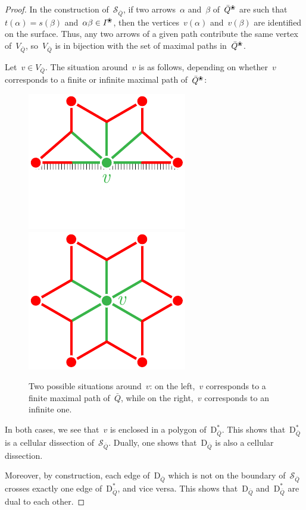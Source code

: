 \documentclass{amsart}
\theoremstyle{definition}
\newcommand{\blossom}{^\text{\ding{96}}} %
\newcommand{\surface}{\mathcal{S}} %
\newcommand{\dual}{^*} %
\newcommand{\dissection}{\mathrm{D}} %
\begin{document}
\begin{proof}
In the construction of~$\surface_{\bar Q}$, if two arrows~$\alpha$ and~$\beta$ of~$\bar Q \blossom$ are such that~${t(\alpha) = s(\beta)}$ and~${\alpha\beta \in I\blossom}$, then the vertices~$v(\alpha)$ and~$v(\beta)$ are identified on the surface.
Thus, any two arrows of a given path contribute the same vertex of~$V_{\bar Q}$, so~$V_{\bar Q}$ is in bijection with the set of maximal paths in~$\bar Q\blossom$.

Let~$v\in V_{\bar Q}$. The situation around~$v$ is as follows, depending on whether~$v$ corresponds to a finite or infinite maximal path of~$\bar Q\blossom$:

\begin{figure}[h]
	\capstart
	\centerline{\includegraphics[scale=.7]{halfStar} \qquad \includegraphics[scale=.7]{star}}
	\caption{Two possible situations around~$v$: on the left,~$v$ corresponds to a finite maximal path of~$\bar Q$, while on the right,~$v$ corresponds to an infinite one.}
	\label{fig:stars}
\end{figure}

In both cases, we see that~$v$ is enclosed in a polygon of~$\dissection_{\bar Q}\dual$.  This shows that~$\dissection_{\bar Q}\dual$ is a cellular dissection of~$\surface_{\bar Q}$.
Dually, one shows that~$\dissection_{\bar Q}$ is also a cellular dissection.

Moreover, by construction, each edge of~$\dissection_{\bar Q}$ which is not on the boundary of~$\surface_{\bar Q}$ crosses exactly one edge of~$\dissection_{\bar Q}\dual$, and vice versa.
This shows that~$\dissection_{\bar Q}$ and~$\dissection_{\bar Q}\dual$ are dual to each other.
\end{proof}
\end{document}
